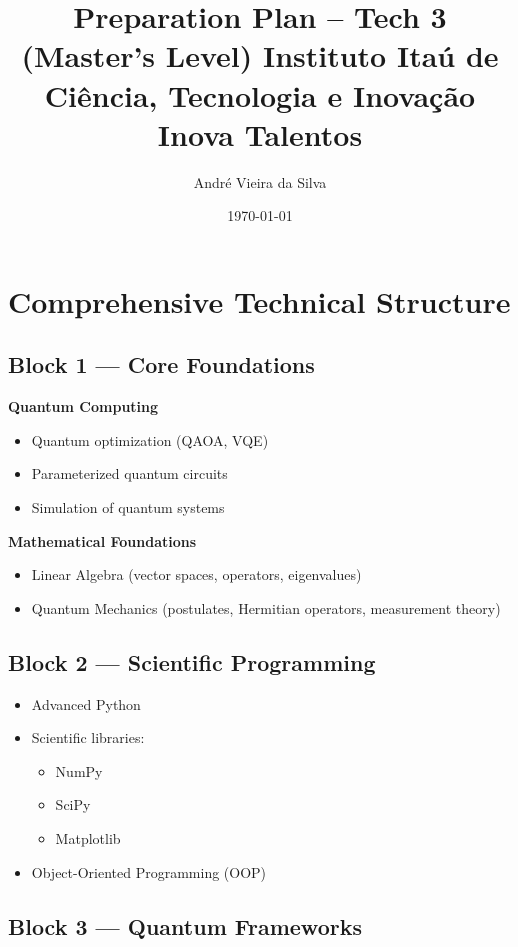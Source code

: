 \documentclass[a4paper,12pt]{book}
\title{\LARGE \textbf{Preparation Plan -- Tech 3 (Master's Level)
\large Instituto Itaú de Ciência, Tecnologia e Inovação \\
\large Inova Talentos}}
\author{Andr\'e Vieira da Silva}
\date{\today}
\begin{document}
\maketitle

\tableofcontents
\newpage

\section*{Comprehensive Technical Structure}

\subsection*{Block 1 — Core Foundations}

\textbf{Quantum Computing}
\begin{itemize}
    \item Quantum optimization (QAOA, VQE)
    \item Parameterized quantum circuits
    \item Simulation of quantum systems
\end{itemize}

\textbf{Mathematical Foundations}
\begin{itemize}
    \item Linear Algebra (vector spaces, operators, eigenvalues)
    \item Quantum Mechanics (postulates, Hermitian operators, measurement theory)
\end{itemize}

\subsection*{Block 2 — Scientific Programming}

\begin{itemize}
    \item Advanced Python
    \item Scientific libraries:
    \begin{itemize}
        \item NumPy
        \item SciPy
        \item Matplotlib
    \end{itemize}
    \item Object-Oriented Programming (OOP)
\end{itemize}

\subsection*{Block 3 — Quantum Frameworks}
\end{document}

